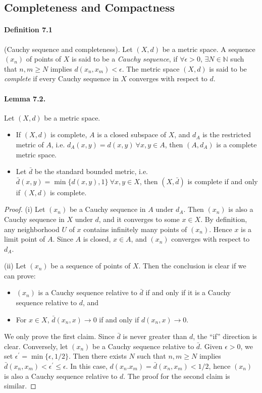\documentclass{article}
\numberwithin{equation}{section}
\theoremstyle{plain}
\theoremstyle{definition}
\begin{document}
\subsection{Completeness and Compactness}
\paragraph{Definition 7.1\label{def:7.1}} (Cauchy sequence and completeness). Let $(X,d)$ be a metric space. A sequence $(x_n)$ of points of $X$ is said to be a \textit{Cauchy sequence}, if $\forall\epsilon >0$, $\exists N\in\mathbb{N}$ such that $n,m\geq N$ implies $d(x_n,x_m)<\epsilon$. The metric space $(X,d)$ is said to be \textit{complete} if every Cauchy sequence in $X$ converges with respect to $d$.

\paragraph{Lemma 7.2.\label{lemma:7.2}} Let $(X,d)$ be a metric space.
\begin{itemize}
\item[(i)] If $(X,d)$ is complete, $A$ is a closed subspace of $X$, and $d_A$ is the restricted metric of $A$, i.e. $d_A(x,y)=d(x,y)\ \forall x,y\in A$, then $(A,d_A)$ is a complete metric space.
\item[(ii)] Let $\bar{d}$ be the standard bounded metric, i.e. $\bar{d}(x,y)=\min\{d(x,y),1\}\ \forall x,y\in X$, then $(X,\bar{d})$ is complete if and only if $(X,d)$ is complete.
\end{itemize}
\begin{proof}
(i) Let $(x_n)$ be a Cauchy sequence in $A$ under $d_A$. Then $(x_n)$ is also a Cauchy sequence in $X$ under $d$, and it converges to some $x\in X$. By definition, any neighborhood $U$ of $x$ contains infinitely many points of $(x_n)$. Hence $x$ is a limit point of $A$. Since $A$ is closed, $x\in A$, and $(x_n)$ converges with respect to $d_A$.

(ii) Let $(x_n)$ be a sequence of points of $X$. Then the conclusion is clear if we can prove:
\begin{itemize}
	\item $(x_n)$ is a Cauchy sequence relative to $\bar{d}$ if and only if it is a Cauchy sequence relative to $d$, and
	\item For $x\in X$, $\bar{d}(x_n,x)\to 0$ if and only if $d(x_n,x)\to 0$.
\end{itemize}

We only prove the first claim. Since $\bar{d}$ is never greater than $d$, the ``if'' direction is clear. Conversely, let $(x_n)$ be a Cauchy sequence relative to $\bar{d}$. Given $\epsilon > 0$, we set $\epsilon^\prime=\min\{\epsilon,1/2\}$. Then there exists $N$ such that $n,m\geq N$ implies $\bar{d}(x_n,x_m)<\epsilon^\prime \leq\epsilon$. In this case, $d(x_n.x_m)=\bar{d}(x_n,x_m) < 1/2$, hence $(x_n)$ is also a Cauchy sequence relative to $d$. The proof for the second claim is similar.
\end{proof}
\end{document}
